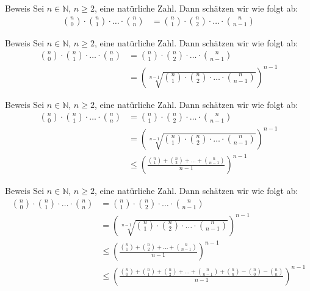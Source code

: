 \documentclass[10pt]{beamer}
\def\bN{\mathbb{N}}
\begin{document}
\begin{frame}{Beweis}
    Sei \( n \in \bN \), \( n \geq 2 \), eine natürliche Zahl. Dann schätzen wir wie folgt ab:
    \begin{align*}
        \binom{n}{0} \cdot \binom{n}{1} \cdot \ldots \cdot \binom{n}{n}
        & = \binom{n}{1} \cdot \binom{n}{2} \cdot \ldots \cdot \binom{n}{n - 1}
    \end{align*}
\end{frame}



\begin{frame}{Beweis}
    Sei \( n \in \bN \), \( n \geq 2 \), eine natürliche Zahl. Dann schätzen wir wie folgt ab:
    \begin{align*}
        \binom{n}{0} \cdot \binom{n}{1} \cdot \ldots \cdot \binom{n}{n}
        & = \binom{n}{1} \cdot \binom{n}{2} \cdot \ldots \cdot \binom{n}{n - 1} \\
        & = \left( \sqrt[n - 1]{\binom{n}{1} \cdot \binom{n}{2} \cdot \ldots \cdot \binom{n}{n - 1}} \right)^{n - 1}
    \end{align*}
\end{frame}



\begin{frame}{Beweis}
    Sei \( n \in \bN \), \( n \geq 2 \), eine natürliche Zahl. Dann schätzen wir wie folgt ab:
    \begin{align*}
        \binom{n}{0} \cdot \binom{n}{1} \cdot \ldots \cdot \binom{n}{n}
        & = \binom{n}{1} \cdot \binom{n}{2} \cdot \ldots \cdot \binom{n}{n - 1} \\
        & = \left( \sqrt[n - 1]{\binom{n}{1} \cdot \binom{n}{2} \cdot \ldots \cdot \binom{n}{n - 1}} \right)^{n - 1} \\
        & \leq \left( \frac{\binom{n}{1} + \binom{n}{2} + \ldots + \binom{n}{n - 1}}{n - 1} \right)^{n - 1}
    \end{align*}
\end{frame}



\begin{frame}{Beweis}
    Sei \( n \in \bN \), \( n \geq 2 \), eine natürliche Zahl. Dann schätzen wir wie folgt ab:
    \begin{align*}
        \binom{n}{0} \cdot \binom{n}{1} \cdot \ldots \cdot \binom{n}{n}
        & = \binom{n}{1} \cdot \binom{n}{2} \cdot \ldots \cdot \binom{n}{n - 1} \\
        & = \left( \sqrt[n - 1]{\binom{n}{1} \cdot \binom{n}{2} \cdot \ldots \cdot \binom{n}{n - 1}} \right)^{n - 1} \\
        & \leq \left( \frac{\binom{n}{1} + \binom{n}{2} + \ldots + \binom{n}{n - 1}}{n - 1} \right)^{n - 1} \\
        & \leq \left( \frac{\binom{n}{0} + \binom{n}{1} + \binom{n}{2} + \ldots + \binom{n}{n - 1} + \binom{n}{n} - \binom{n}{0} - \binom{n}{n}}{n - 1} \right)^{n - 1}
    \end{align*}
\end{frame}
\end{document}
